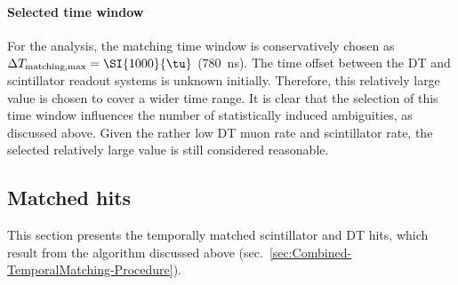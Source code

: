 \paragraph{Selected time window}
For the analysis, the matching time window is conservatively chosen as $\Delta T_\text{matching,max}=\SI{1000}{\tu}$ (\SI{780}{\nano\second}). The time offset between the \ac{DT} and scintillator readout systems is unknown initially. Therefore, this relatively large value is chosen to cover a wider time range. It is clear that the selection of this time window influences the number of statistically induced ambiguities, as discussed above. Given the rather low \ac{DT} muon rate and scintillator rate, the selected relatively large value is still considered reasonable.

\subsection{Matched hits}
\label{sec:Combined-TemporalMatching-Hits}
This section presents the temporally matched scintillator and \ac{DT} hits, which result from the algorithm discussed above (sec.\ \ref{sec:Combined-TemporalMatching-Procedure}).

